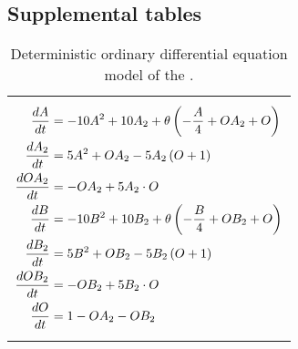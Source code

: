 %
%
%
%

\continuesupplemental

\subsection{Supplemental tables}
\begin{table}[h]
    \caption{\label{tab:gts_odes}Deterministic ordinary differential equation model of the \gtsabbrev{}.}
    \begin{tabularx}{\textwidth}{Z}
        \hline\hline
         \\
        \hline
        {\begin{align*}
            \frac{dA}{dt}   &= -10 A^2 + 10 A_2 + \theta \left( -\frac{A}{4} + OA_2 + O \right) \\
            \frac{dA_2}{dt}  &= 5 A^2 + OA_2 - 5 A_2 \left( O + 1 \right)                            \\
            \frac{dOA_2}{dt} &= -OA_2 + 5 A_2 \cdot O                                                    \\
            \frac{dB}{dt}   &= -10 B^2 + 10 B_2 + \theta \left( -\frac{B}{4} + OB_2 + O \right) \\
            \frac{dB_2}{dt}  &= 5 B^2 + OB_2 - 5 B_2 \left( O + 1 \right)                            \\
            \frac{dOB_2}{dt} &= -OB_2 + 5 B_2 \cdot O                                                    \\
            \frac{dO}{dt}   &= 1 - OA_2 - OB_2
        \end{align*}} \\
        \hline\hline
    \end{tabularx}
\end{table}
\clearpage

%
